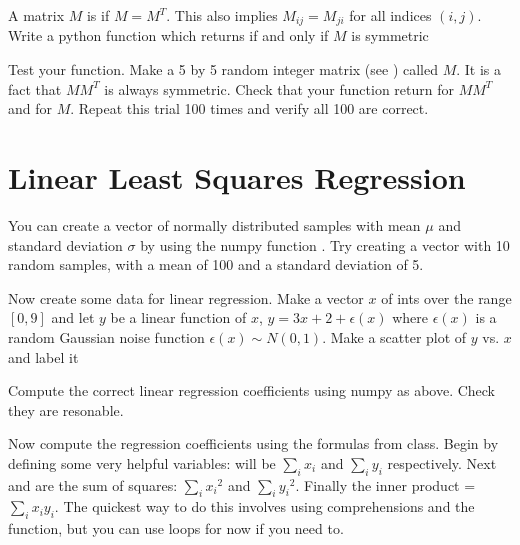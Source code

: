 \documentclass[letterpaper,10pt,english]{jupyterBook}
\begin{document}
\sphinxAtStartPar
A matrix \(M\) is  if \(M = M^T\). This also implies \(M_{ij} = M_{ji}\) for all indices \((i,j)\). Write a python function  which returns  if and only if \(M\) is symmetric

\sphinxAtStartPar
Test your function. Make a 5 by 5 random integer matrix (see ) called \(M\). It is a fact that \(MM^T\) is always symmetric. Check that your function return  for \(MM^T\) and  for \(M\). Repeat this trial 100 times and verify all 100 are correct.


\section{Linear Least Squares Regression}
\label{\detokenize{lessons/least-squares-01:linear-least-squares-regression}}
\sphinxAtStartPar
You can create a vector of normally distributed samples with mean \(\mu\) and standard deviation \(\sigma\) by using the numpy function . Try creating a vector with 10 random samples, with a mean of 100 and a standard deviation of 5.

\sphinxAtStartPar
Now create some data for linear regression. Make a vector \(x\) of ints over the range \([0,9]\) and let \(y\) be a linear function of \(x\), \(y = 3x+2+\epsilon(x)\) where \(\epsilon(x)\) is a random Gaussian noise function \(\epsilon(x) \sim N(0,1)\). Make a scatter plot of \(y\) vs. \(x\) and label it

\sphinxAtStartPar
Compute the correct linear regression coefficients using numpy as above. Check they are resonable.

\sphinxAtStartPar
Now compute the regression coefficients using the formulas from class. Begin by defining some very helpful variables:  will be \(\sum_i {x_i}\) and \(\sum_i {y_i}\) respectively. Next  and  are the sum of squares: \(\sum_i {x_i}^2\) and \(\sum_i {y_i}^2\). Finally the inner product  = \(\sum_i x_iy_i\). The quickest way to do this involves using comprehensions and the  function, but you can use loops for now if you need to.
\end{document}
